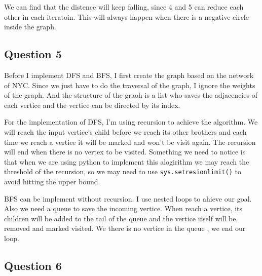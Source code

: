 \documentclass[conference]{IEEEtran}
\begin{document}
We can find that the distence will keep falling, since 4 and 5 can reduce each other in each iteratoin.
This will always happen when there is a negative circle inside the graph.

\subsection*{Question 5}

Before I implement DFS and BFS, I first create the graph based on the network of NYC. 
Since we just have to do the traversal of the graph, I ignore the weights of the graph.
And the structure of the graoh is a list who saves the adjacencies of each vertice and 
the vertice can be directed by its index.

For the implementation of DFS, I'm using recursion to achieve the algorithm. We will reach 
the input vertice's child before we reach its other brothers and each time we reach a vertice 
it will be marked and won't be visit again. The recursion will end when there is no vertex to 
be visited. Something we need to notice is that when we are using python to implement this alogirithm
we may reach the threshold of the recursion, so we may need to use \verb|sys.setresionlimit()| to avoid
hitting the upper bound.

BFS can be implement without recursion. I use nested loops to ahieve our goal. Also we need a queue
to save the incoming vertice. When reach a vertice, its children will be added to the tail of the 
queue and the vertice itself will be removed and marked visited. We there is no vertice in the queue
, we end our loop.

\subsection*{Question 6}
\end{document}

